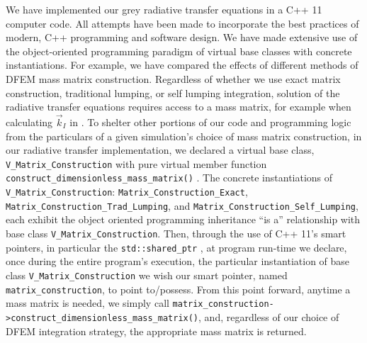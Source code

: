 We have implemented our grey radiative transfer equations in a C++ 11 computer code.
All attempts have been made to incorporate the best practices of modern, C++ programming and software design\cite{cpp_book,effective_cpp}.
We have made extensive use of the object-oriented programming paradigm of virtual base classes with concrete instantiations.
For example, we have compared the effects of different methods of DFEM mass matrix construction.
Regardless of whether we use exact matrix construction, traditional lumping, or self lumping integration, solution of the radiative transfer equations requires access to a mass matrix, for example when calculating $\vec{k}_I$ in .
To shelter other portions of our code and programming logic from the particulars of a given simulation's choice of mass matrix construction, in our radiative transfer implementation, we declared a virtual base class, \verb+V_Matrix_Construction+ with pure virtual member function \verb+construct_dimensionless_mass_matrix()+ .
The concrete instantiations of \verb+V_Matrix_Construction+: \verb+Matrix_Construction_Exact+, \verb+Matrix_Construction_Trad_Lumping+, and \verb+Matrix_Construction_Self_Lumping+, each exhibit the object oriented programming inheritance ``is a'' relationship with base class \verb+V_Matrix_Construction+.
Then, through the use of C++ 11's smart pointers, in particular the \verb+std::shared_ptr+ ,  at program run-time we declare, once during the entire program's execution, the particular instantiation of base class \verb+V_Matrix_Construction+  we wish our smart pointer, named \verb+matrix_construction+, to point to/possess.
From this point forward, anytime a mass matrix is needed, we simply call \verb+matrix_construction->construct_dimensionless_mass_matrix()+, and, regardless of our choice of DFEM integration strategy, the appropriate mass matrix is returned.

